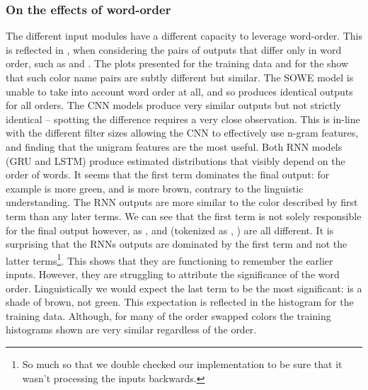 \documentclass[11pt,a4paper]{article}
\begin{document}
\subsubsection{On the effects of word-order}
The different input modules have a different capacity to leverage word-order.
This is reflected in ,
when considering the pairs of outputs that differ only in word order, such as  and .
The plots presented for the training data and for the \empmodel{} show that such color name pairs are subtly different but similar.
The SOWE model is unable to take into account word order at all, and so produces identical outputs for all orders.
The CNN models produce very similar outputs but not strictly identical -- spotting the difference requires a very close observation.
This is in-line with the different filter sizes allowing the CNN to effectively use n-gram features, and finding that the unigram features are the most useful.
Both RNN models (GRU and LSTM) produce estimated distributions that visibly depend on the order of words.
It seems that the first term dominates the final output: for example  is more green, and   is more brown, contrary to the linguistic understanding.
The RNN outputs are more similar to the color described by first term than any later terms.
We can see that the first term is not solely responsible for the final output however, as ,  and  (tokenized as , ) are all different.
It is surprising that the RNNs outputs  are dominated by the first term and not the latter terms\footnote{So much so that we double checked our implementation to be sure that it wasn't processing the inputs backwards.}.
This shows that they are  functioning to remember the earlier inputs.
However, they are struggling to attribute the significance of the word order.
Linguistically we would expect the last term to be the most significant:
 is a shade of brown, not green.
This expectation is reflected in the histogram for the training data.
Although, for many of the order swapped colors the training histograms shown are very similar regardless of the order.
\end{document}
